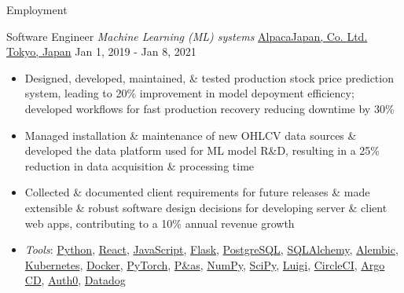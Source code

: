\documentclass[]{mcdowellcv}
\begin{document}
\begin{cvsection}{Employment}
  \begin{cvsubsection}
    {Software Engineer \linebreak \textit{Machine Learning (ML) systems}}
    {\href{https://www.alpaca.markets/jp/about.html}{AlpacaJapan, Co. Ltd. \linebreak Tokyo, Japan}}
    {Jan 1, 2019 - Jan 8, 2021}
    \begin{itemize}
      \item
            Designed, developed, maintained, \& tested production stock price
            prediction system, leading to 20\% improvement in model depoyment
            efficiency; developed workflows for fast production recovery
            reducing downtime by 30\%
      \item
            Managed installation \& maintenance of new OHLCV data sources \&
            developed the data platform used for ML model R\&D, resulting in
            a 25\% reduction in data acquisition \& processing time
      \item
            Collected \& documented client requirements for future releases \&
            made extensible \& robust software design decisions for developing
            server \& client web apps, contributing to a 10\% annual revenue
            growth
      \item
            \textit{Tools}:
            \href{https://www.python.org/}{Python},
            \href{https://react.dev/}{React},
            \href{https://developer.mozilla.org/en-US/docs/Web/JavaScript}{JavaScript},
            \href{https://flask.palletsprojects.com/}{Flask},
            \href{https://www.postgresql.org/}{PostgreSQL},
            \href{https://www.sqlalchemy.org/}{SQLAlchemy},
            \href{https://alembic.sqlalchemy.org/en/latest/}{Alembic},
            \href{https://kubernetes.io/}{Kubernetes},
            \href{https://www.docker.com/}{Docker},
            \href{https://pytorch.org/}{PyTorch},
            \href{https://p\&as.pydata.org/}{P\&as},
            \href{https://numpy.org/}{NumPy}, \href{https://scipy.org/}{SciPy},
            \href{https://github.com/spotify/luigi}{Luigi},
            \href{https://circleci.com/}{CircleCI},
            \href{https://argoproj.github.io/cd/}{Argo CD},
            \href{https://auth0.com/}{Auth0},
            \href{https://www.datadoghq.com/}{Datadog}
    \end{itemize}
  \end{cvsubsection}


\end{cvsection}
\end{document}
